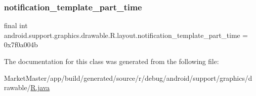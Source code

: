 \subsubsection{\texorpdfstring{notification\+\_\+template\+\_\+part\+\_\+time}{notification\_template\_part\_time}}
{\footnotesize\ttfamily final int android.\+support.\+graphics.\+drawable.\+R.\+layout.\+notification\+\_\+template\+\_\+part\+\_\+time = 0x7f0a004b\hspace{0.3cm}{\ttfamily [static]}}



The documentation for this class was generated from the following file\+:\begin{DoxyCompactItemize}
\item 
Market\+Master/app/build/generated/source/r/debug/android/support/graphics/drawable/\mbox{\hyperlink{debug_2android_2support_2graphics_2drawable_2R_8java}{R.\+java}}\end{DoxyCompactItemize}

